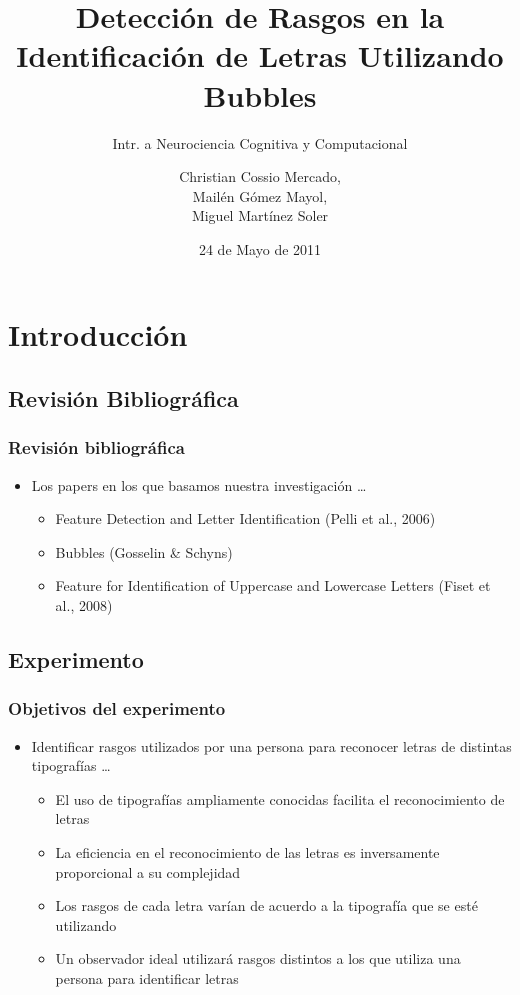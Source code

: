 \documentclass[10pt,presentation]{beamer}
\title{Detecci\'on de Rasgos en la Identificaci\'on de Letras Utilizando Bubbles}
\subtitle{Intr. a Neurociencia Cognitiva y Computacional}
\author[Martinez Soler,\\Gomez Mayol,\\Cossio Mercado]{Christian Cossio Mercado,\\Mail\'en G\'omez Mayol,\\Miguel Mart\'inez Soler}
\institute{Departamento de Computación - FCEyN, UBA}
\date{24 de Mayo de 2011}
\begin{document}
\begin{frame}%
  \titlepage
\end{frame}

\section{Introducci\'on}
\subsection{Revisi\'on Bibliogr\'afica}
\begin{frame}
  \frametitle{Revisión bibliográfica}
  \begin{itemize}
    \item Los papers en los que basamos nuestra investigaci\'on \ldots \pause
    \begin{itemize}
      \item Feature Detection and Letter Identification (Pelli et al., 2006) \pause
      \item Bubbles (Gosselin \& Schyns) \pause
      \item Feature for Identification of Uppercase and Lowercase Letters (Fiset et al., 2008)
    \end{itemize}
  \end{itemize}
\end{frame}

\subsection{Experimento}
\begin{frame}
  \frametitle{Objetivos del experimento}
  \begin{itemize}
    \item Identificar rasgos utilizados por una persona para reconocer letras de distintas tipograf\'ias  \ldots \pause
    \begin{itemize}
      \item El uso de tipograf\'ias ampliamente conocidas facilita el reconocimiento de letras \pause
      \item La eficiencia en el reconocimiento de las letras es inversamente proporcional a su complejidad \pause
      \item Los rasgos de cada letra var\'ian de acuerdo a la tipograf\'ia que se est\'e utilizando \pause
      \item Un observador ideal utilizar\'a rasgos distintos a los que utiliza una persona para identificar letras	
    \end{itemize}
\end{itemize}
\end{frame}
\end{document}
